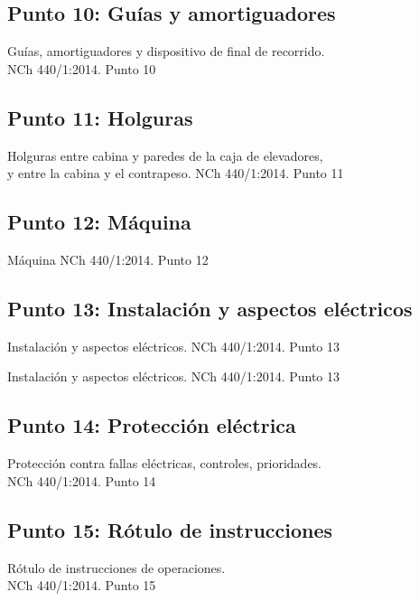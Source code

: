 \subsection{Punto 10: Guías y amortiguadores}
\begin{frame}{Guías, amortiguadores y dispositivo de final de recorrido.\\NCh 440/1:2014. Punto 10}
\end{frame}

\subsection{Punto 11: Holguras}
\begin{frame}{Holguras entre cabina y paredes de la caja de elevadores,\\y entre la cabina y el contrapeso. NCh 440/1:2014. Punto 11}
\end{frame}

\subsection{Punto 12: Máquina}
\begin{frame}{Máquina NCh 440/1:2014. Punto 12}
\end{frame}

\subsection{Punto 13: Instalación y aspectos eléctricos}
\begin{frame}{Instalación y aspectos eléctricos. NCh 440/1:2014. Punto 13}
\end{frame}

\begin{frame}{Instalación y aspectos eléctricos. NCh 440/1:2014. Punto 13}
\end{frame}

\subsection{Punto 14: Protección eléctrica}
\begin{frame}{Protección contra fallas eléctricas, controles, prioridades.\\NCh 440/1:2014. Punto 14}
\end{frame}

\subsection{Punto 15: Rótulo de instrucciones}
\begin{frame}{Rótulo de instrucciones de operaciones.\\NCh 440/1:2014. Punto 15}
\end{frame}

